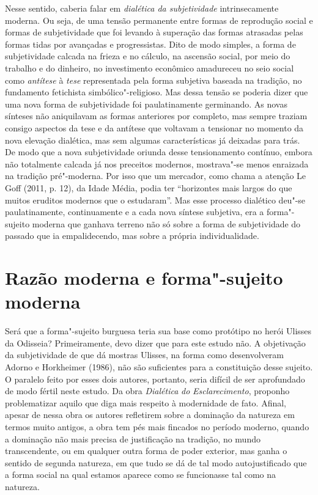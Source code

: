 Nesse sentido, caberia falar em \emph{dialética da subjetividade}
intrinsecamente moderna. Ou seja, de uma tensão permanente entre
formas de reprodução social e formas de subjetividade que foi levando à
superação das formas atrasadas pelas formas tidas por avançadas e
progressistas. Dito de modo simples, a forma de subjetividade calcada na
frieza e no cálculo, na ascensão social, por meio do trabalho e do
dinheiro, no investimento econômico amadureceu no seio social como
\emph{antítese} à \emph{tese} representada pela forma subjetiva baseada
na tradição, no fundamento fetichista simbólico"-religioso. Mas dessa
tensão se poderia dizer que uma nova forma de subjetividade foi
paulatinamente germinando. As novas sínteses não aniquilavam as formas
anteriores por completo, mas sempre traziam consigo aspectos da tese e
da antítese que voltavam a tensionar no momento da nova elevação
dialética, mas sem algumas características já deixadas para trás. De
modo que a nova subjetividade oriunda desse tensionamento contínuo,
embora não totalmente calcada já nos preceitos modernos, mostrava"-se
menos enraizada na tradição pré"-moderna. Por isso que um mercador, como
chama a atenção Le Goff (2011, p. 12), da Idade Média, podia ter
``horizontes mais largos do que muitos eruditos modernos que o
estudaram''. Mas esse processo dialético deu"-se paulatinamente,
continuamente e a cada nova síntese subjetiva, era a forma"-sujeito
moderna que ganhava terreno não só sobre a forma de subjetividade do
passado que ia empalidecendo, mas sobre a própria individualidade.

\section{Razão moderna e forma"-sujeito moderna}

Será que a forma"-sujeito burguesa teria sua base como protótipo no herói
Ulisses da Odisseia? Primeiramente, devo dizer que para este
estudo não. A objetivação da subjetividade de que dá mostras Ulisses, na
forma como desenvolveram Adorno e Horkheimer (1986), não são suficientes
para a constituição desse sujeito. O paralelo feito por esses dois
autores, portanto, seria difícil de ser aprofundado de modo fértil
neste estudo. Da obra \emph{Dialética} \emph{do} \emph{Esclarecimento},
proponho problematizar aquilo que diga mais respeito à modernidade de fato.
Afinal, apesar de nessa obra os autores refletirem sobre a dominação da
natureza em termos muito antigos, a obra tem pés mais fincados no
período moderno, quando a dominação não mais precisa de justificação na
tradição, no mundo transcendente, ou em qualquer outra forma de poder
exterior, mas ganha o sentido de segunda natureza, em que tudo se dá de
tal modo autojustificado que a forma social na qual estamos aparece como
se funcionasse tal como na natureza.

